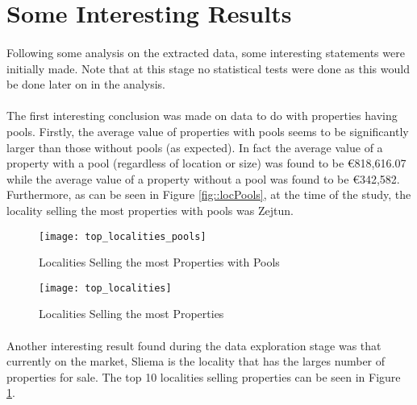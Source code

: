 \section{Some Interesting Results}
\paragraph{ }Following some analysis on the extracted data, some interesting statements were initially made. Note that at this stage no statistical tests were done as this would be done later on in the analysis.

\paragraph{ }The first interesting conclusion was made on data to do with properties having pools. Firstly, the average value of properties with pools seems to be significantly larger than those without pools (as expected). In fact the average value of a property with a pool (regardless of location or size) was found to be \euro 818,616.07 while the average value of a property without a pool was found to be \euro 342,582. Furthermore, as can be seen in Figure \ref{fig::locPools}, at the time of the study, the locality selling the most properties with pools was Zejtun. 

\begin{figure}[!b]
	\begin{minipage}[b]{0.45\linewidth}
		\centering
		\texttt{[image: top\_localities\_pools]}
		\caption[Pools]{Localities Selling the most Properties with Pools}
		\label{fig::locPools}
	\end{minipage}	
	\hspace{0.5cm}
	\begin{minipage}[b]{0.45\linewidth}
		\centering
		\texttt{[image: top\_localities]}
		\caption[Top Localities]{Localities Selling the most Properties}
		\label{fig::toplocalities}
	\end{minipage}	
\end{figure}

\paragraph{ }Another interesting result found during the data exploration stage was that currently on the market, Sliema is the locality that has the larges number of properties for sale. The top 10 localities selling properties can be seen in Figure \ref{fig::toplocalities}.

